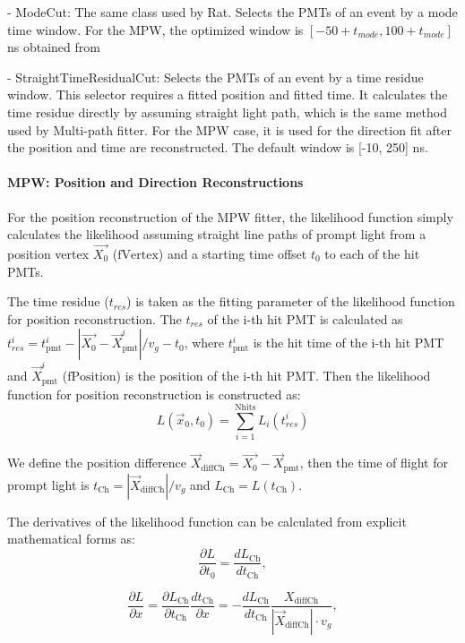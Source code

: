 \begin{itemize}
	- ModeCut: The same class used by Rat. Selects the PMTs of an event by a mode time window. For the MPW, the optimized window is $[-50 + t_{mode}, 100 + t_{mode}]$ ns obtained from %
	
	- StraightTimeResidualCut: Selects the PMTs of an event by a time residue window. This selector requires a fitted position and fitted time. It calculates the time residue directly by assuming straight light path, which is the same method used by Multi-path fitter. For the MPW case, it is used for the direction fit after the position and time are reconstructed. The default window is [-10, 250] ns.
	
\end{itemize}

\paragraph{MPW: Position and Direction Reconstructions}

For the position reconstruction of the MPW fitter, the likelihood function simply calculates the likelihood assuming straight line paths of prompt light from a position vertex $\vec{X_0}$ ($\mathrm{fVertex}$) and a starting time offset $t_0$ to each of the hit PMTs. 

The time residue ($t_{res}$) is taken as the fitting parameter of the likelihood function for position reconstruction. The $t_{res}$ of the i-th hit PMT is calculated as $t^i_{res} = t_{{\mathrm{pmt}}}^i - |\vec{X_0}-\vec{X}_{\mathrm{pmt}}^i|/v_g-t_0$, where $t_{{\mathrm{pmt}}}^i$ is the hit time of the i-th hit PMT and $\vec{X}_{\mathrm{pmt}}^i$ ($\mathrm{fPosition}$) is the position of the i-th hit PMT. Then the likelihood function for position reconstruction is constructed as:
\[
L(\vec{x}_0,t_0)=\sum_{i=1}^{{\mathrm{Nhits}}}L_i(t^i_{res})
\]

We define the position difference $\vec{X}_{{\mathrm{diffCh}}} = \vec{X_0}-\vec{X}_{\mathrm{pmt}}$, then the time of flight for prompt light is  $t_{\mathrm{Ch}}=|\vec{X}_{{\mathrm{diffCh}}}|/v_g$ and $L_{\mathrm{Ch}}=L(t_{\mathrm{Ch}})$.

The derivatives of the likelihood function can be calculated from explicit mathematical forms as:
\[
\frac{\partial L}{\partial t_0}=\frac{dL_{\mathrm{Ch}}}{dt_{\mathrm{Ch}}},
\]

\[
\frac{\partial L}{\partial x}=\frac{\partial L_{\mathrm{Ch}}}{\partial t_{\mathrm{Ch}}}\frac{dt_{\mathrm{Ch}}}{\partial x}=-\frac{dL_{\mathrm{Ch}}}{dt_{\mathrm{Ch}}}\frac{X_{{\mathrm{diffCh}}}}{|\vec{X}_{{\mathrm{diffCh}}}|\cdot v_g},
\]

